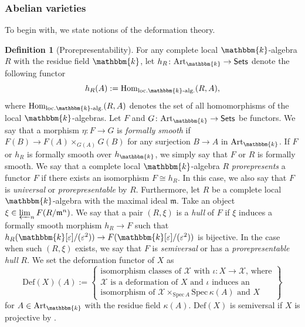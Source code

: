 \documentclass[12pt,twoside]{amsart}
\theoremstyle{definition}
\newtheorem{defn}[thm]{Definition}
\begin{document}
\subsubsection{Abelian varieties}



To begin with, we state notions of the deformation theory.

\begin{defn}[Prorepresentability]
For any complete local $\mathbbm{k}$-algebra $R$ with the residue field $\mathbbm{k}$, let $h_R\colon \mathrm{Art}_{\mathbbm{k}}\to\mathsf{Sets}$ denote the following functor $$h_R(A):=\mathrm{Hom}_{\mathrm{loc.}\mathbbm{k}\textrm{-alg.}}(R,A),$$ where $\mathrm{Hom}_{\mathrm{loc.}\mathbbm{k}\textrm{-alg.}}(R,A)$ denotes the set of all homomorphisms of the local $\mathbbm{k}$-algebras.
 Let $F$ and $G\colon \mathrm{Art}_{\mathbbm{k}}\to\mathsf{Sets}$ be functors.
 We say that a morphism $\eta\colon F\to G$ is {\it formally smooth} if $F(B)\to F(A)\times_{G(A)}G(B)$ for any surjection $B\to A$ in $\mathrm{Art}_{\mathbbm{k}}$.
 If $F$ or $h_R$ is formally smooth over $h_{\mathbbm{k}}$, we simply say that $F$ or $R$ is formally smooth.
 We say that a complete local $\mathbbm{k}$-algebra $R$ {\em prorepresents} a functor $F$ if there exists an isomorphism $F\cong h_R$.
 In this case, we also say that $F$ is {\it universal} or {\it prorepresentable} by $R$.
 Furthermore, let $R$ be a complete local $\mathbbm{k}$-algebra with the maximal ideal $\mathfrak{m}$.
 Take an object $\xi\in \varprojlim_n F(R/\mathfrak{m}^n)$.
 We say that a pair $(R,\xi)$ is a {\it hull} of $F$ if $\xi$ induces a formally smooth morphism $h_R\to F$ such that $h_R(\mathbbm{k}[\varepsilon]/(\varepsilon^2))\to F(\mathbbm{k}[\varepsilon]/(\varepsilon^2))$ is bijective.
 In the case when such $(R,\xi)$ exists, we say that $F$ is {\it semiversal} or has a {\it prorepresentable hull} $R$.
We set the deformation functor of $X$ as
\[
    \mathrm{Def}(X)(A):=
    \left\{
\begin{array}{l}
\text{isomorphism classes of $\mathcal{X}$ with $\iota\colon X\to \mathcal{X}$, where}\\
\text{$\mathcal{X}$ is a deformation of $X$ and $\iota$ induces an }\\
\text{isomorphism of $\mathcal{X}\times_{\mathrm{Spec}\,A}\mathrm{Spec}\,\kappa(A)$ and $X$}
\end{array}\right\}
    \]
    for $A\in\mathrm{Art}_{\mathbbm{k}}$ with the residue field $\kappa(A)$.
    $\mathrm{Def}(X)$ is semiversal if $X$ is projective by \cite[Proposition 3.10]{Schlessinger}.
\end{defn}
\end{document}
